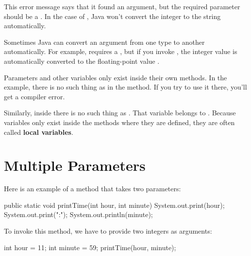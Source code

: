 This error message says that it found an  argument, but the required parameter should be a .
In the case of , Java won't convert the integer  to the string  automatically.


Sometimes Java can convert an argument from one type to another automatically.
For example,  requires a , but if you invoke , the integer value  is automatically converted to the floating-point value .


Parameters and other variables only exist inside their own methods.
In the  example, there is no such thing as  in the  method.
If you try to use it there, you'll get a compiler error.

Similarly, inside  there is no such thing as .
That variable belongs to .
Because variables only exist inside the methods where they are defined, they are often called {\bf local variables}.


\section{Multiple Parameters}


Here is an example of a method that takes two parameters:

\begin{code}
public static void printTime(int hour, int minute) {
    System.out.print(hour);
    System.out.print(":");
    System.out.println(minute);
}
\end{code}

%
%

To invoke this method, we have to provide two integers as arguments:

\begin{code}
int hour = 11;
int minute = 59;
printTime(hour, minute);
\end{code}

